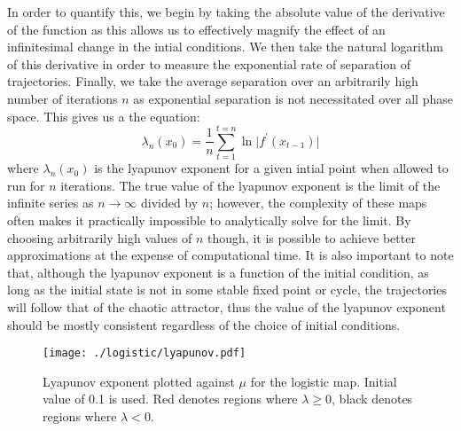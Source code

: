 In order to quantify this, we begin by taking the absolute value of the derivative of the function as this allows us to effectively magnify the effect of an infinitesimal change in the intial conditions. We then take the natural logarithm of this derivative in order to measure the exponential rate of separation of trajectories. Finally, we take the average separation over an arbitrarily high number of iterations $n$ as exponential separation is not necessitated over all phase space. This gives us a the equation:
\begin{equation}
    \lambda_n(x_0)=\frac{1}{n}\sum^{t=n}_{t=1}\ln\lvert f^\prime(x_{t-1})\rvert
\end{equation}
where $\lambda_n(x_0)$ is the lyapunov exponent for a given intial point when allowed to run for $n$ iterations. The true value of the lyapunov exponent is the limit of the infinite series as $n\rightarrow\infty$ divided by $n$; however, the complexity of these maps often makes it practically impossible to analytically solve for the limit. By choosing arbitrarily high values of $n$ though, it is possible to achieve better approximations at the expense of computational time. It is also important to note that, although the lyapunov exponent is a function of the initial condition, as long as the initial state is not in some stable fixed point or cycle, the trajectories will follow that of the chaotic attractor, thus the value of the lyapunov exponent should be mostly consistent regardless of the choice of initial conditions.
\begin{figure}
    \centering
    \texttt{[image: ./logistic/lyapunov.pdf]}
    \caption{Lyapunov exponent plotted against $\mu$ for the logistic map. Initial value of 0.1 is used. Red denotes regions where $\lambda\geq0$, black denotes regions where $\lambda<0$.}
    \label{log_lyapunov}
\end{figure}

